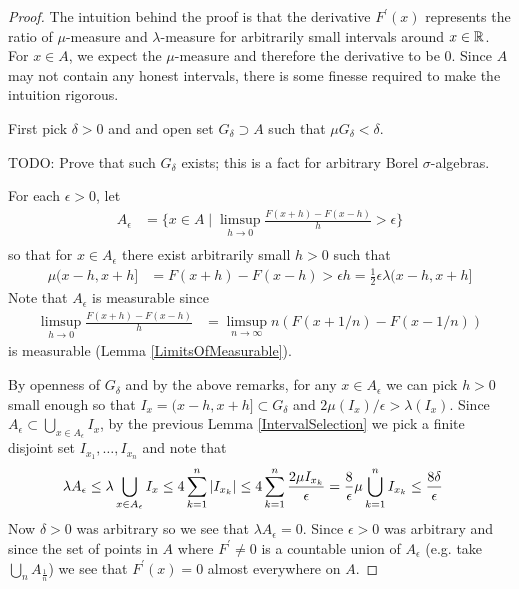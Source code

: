 \begin{proof}The intuition behind the proof is that the derivative
  $F^\prime(x)$ represents the ratio of $\mu$-measure and
  $\lambda$-measure for arbitrarily small intervals around $x \in
  \mathbb{R}$.  For $x \in A$, we expect the $\mu$-measure and therefore
  the derivative to be $0$.  Since $A$ may not contain any honest
  intervals, there is some finesse required to make the intuition rigorous.

First pick $\delta > 0$ and and open set $G_\delta \supset A$ such that $\mu
G_\delta < \delta$.  

TODO: Prove that such $G_\delta$ exists; this is a fact for arbitrary
Borel $\sigma$-algebras.

For each $\epsilon > 0$, let 
\begin{align*}
A_\epsilon &= \{ x \in A \mid \limsup_{h \to 0} \frac{F(x + h) - F(x -
  h)}{h} > \epsilon \} \\
\end{align*}
so that for $x \in A_\epsilon$ there exist arbitrarily small $h > 0$
such that 
\begin{align*}
\mu(x-h,x+h] &=F(x + h) - F(x -  h) > \epsilon h =
\frac{1}{2}\epsilon \lambda(x-h,x+h]
\end{align*}
Note that $A_\epsilon$ is measurable since 
\begin{align*}
\limsup_{h \to 0}  \frac{F(x + h) - F(x -
  h)}{h} &= \limsup_{n \to \infty} n \left(F(x + 1/n) - F(x -
  1/n)\right)
\end{align*} 
is measurable (Lemma \ref{LimitsOfMeasurable}).

By openness of $G_\delta$ and by the above remarks, for any $x \in A_\epsilon$ we can pick $h > 0$ small enough so that
$I_x = (x - h, x+h] \subset G_\delta$ and $2\mu(I_x)/\epsilon > \lambda(I_x)$.  Since $A_\epsilon \subset
\bigcup_{x \in A_\epsilon} I_x$, by the previous Lemma
\ref{IntervalSelection} we pick a finite disjoint set $I_{x_1}, \dots,
I_{x_n}$ and note that
\begin{align*}
\lambda A_\epsilon &\leq \lambda 
\bigcup_{x \in A_\epsilon} I_x \leq 4 \sum_{k=1}^n \left \vert I_{x_k} \right \vert \leq
4 \sum_{k=1}^n \frac{2\mu I_{x_k}}{ \epsilon} = \frac{8}{\epsilon} \mu
\bigcup_{k=1}^n I_{x_k} \leq \frac{8\delta}{\epsilon}
\end{align*}
Now $\delta > 0$ was arbitrary so we see that $\lambda A_\epsilon =
0$.  Since $\epsilon > 0$ was arbitrary and since the set of points in
$A$ where $F^\prime \neq
0$ is a countable union of $A_\epsilon$ (e.g. take $\bigcup_n
A_{\frac{1}{n}}$)  we see that $F^\prime(x) = 0$
almost everywhere on $A$.
\end{proof}

